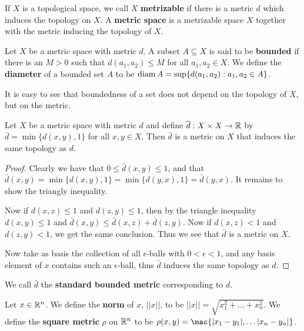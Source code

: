 \begin{definition}
    If $X$ is a topological space, we call  $X$ \textbf {metrizable} if there is a metric $d$ which
    induces the topology on $X$. A \textbf {metric space} is a metrizable space $X$ together with
    the metric inducing the topology of $X$.
\end{definition}

\begin{definition}
    Let $X$ be a metric space with metric $d$. A subset $A \subseteq X$ is said to be \textbf
    {bounded} if there is an $M>0$ such that $d(a_1,a_2) \leq M$ for all $ a_1,a_2 \in X$. We define
    the \textbf{diameter} of a bounded set $A$ to be $\operatorname{diam}{A}=\sup\{d(a_1,a_2):a_1,a_2 \in A\}$.
\end{definition}

It is easy to see that boundedness of a set does not depend on the topology of $X$, but on the
metric.

\begin{theorem}\label{2.2.3}
    Let $X$ be a metric space with metric $d$ and define  $\overline{d}:X \times X \rightarrow \mathbb{R}$ by
    $\bar{d}=\min\{d(x,y),1\}$ for all $x,y \in X$. Then  $\bar{d}$ is a metric on $X$ that induces
    the same topology as  $d$.
\end{theorem}
\begin{proof}
    Clearly we have that $0 \leq \bar{d}(x,y) \leq 1$, and that
    $\bar{d}(x,y)=\min\{d(x,y),1\}=\min\{d(y,x),1\}=\bar{d}(y,x)$. It remains to show the triangly
    inequality.

    Now if $d(x,z) \leq 1$ and $d(z,y) \leq 1$, then by the triangle inequality $d(x,y) \leq 1$ and
    $\bar{d}(x,y) \leq \bar{d}(x,z)+\bar{d}(z,y)$. Now if $d(x,z)<1$ and $d(z,y)<1$, we get the same
    conclusion. Thus we see that $\bar{d}$ is a metric on $X$.

    Now take as basis the collection of all  $\epsilon$-balls with  $0<\epsilon<1$, and any basis
    element of  $x$ contains such an  $\epsilon$-ball, thus  $\bar{d}$ induces the same topology as
    $d$.
\end{proof}

\begin{definition}
    We call $\bar{d}$ the \textbf{standard bounded metric} corresponding to $d$.		
\end{definition}

\begin{definition}
    Let $x \in \mathbb{R}^n$. We define the \textbf {norm} of $x$,  $||x||$, to be
    $||x||=\sqrt{x_1^2+ \dots +x_n^2}$. We define the \textbf{square metric} $\rho$  on 
    $\mathbb{R}^n$ to be  $\rho(x,y)=\mac\{|x_1-y_1|, \dots |x_n-y_n|\}$.
\end{definition}

